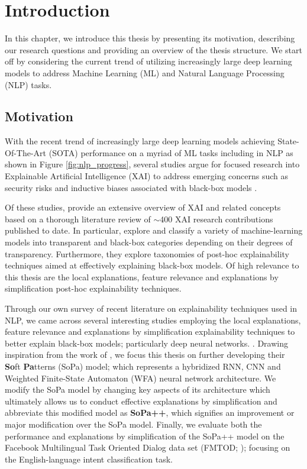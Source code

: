 \chapter{Introduction}

\label{chapter:introduction}

In this chapter, we introduce this thesis by presenting its motivation,
describing our research questions and providing an overview of the thesis
structure. We start off by considering the current trend of utilizing
increasingly large deep learning models to address Machine Learning (ML)
and Natural Language Processing (NLP) tasks.

\section{Motivation}

With the recent trend of increasingly large deep learning models achieving
State-Of-The-Art (SOTA) performance on a myriad of ML tasks
including in NLP as shown in Figure \ref{fig:nlp_progress}, several studies argue for
focused research into Explainable Artificial Intelligence (XAI) to address
emerging concerns such as security risks and inductive biases associated with
black-box models
\citep{doran2017does,townsend2019extracting,danilevsky2020survey,arrieta2020explainable}.

Of these studies, \citet{arrieta2020explainable} provide an extensive overview
of XAI and related concepts based on a thorough literature review of $\sim$400
XAI research contributions published to date. In particular,
\citet{arrieta2020explainable} explore and classify a variety of
machine-learning models into transparent and black-box categories depending on
their degrees of transparency. Furthermore, they explore taxonomies of post-hoc
explainability techniques aimed at effectively explaining black-box models. Of high
relevance to this thesis are the local explanations, feature relevance and
explanations by simplification post-hoc explainability techniques.

Through our own survey of recent literature on explainability techniques used
in NLP, we came across several interesting studies employing the local
explanations, feature relevance and explanations by simplification
explainability techniques to better explain black-box models; particularly
deep neural networks.
\citep{schwartz2018sopa,peng2018rational,suresh-etal-2019-distilling,wang2019state,jiang2020cold}.
Drawing inspiration from the work of \citet{schwartz2018sopa}, we focus this
thesis on further developing their \textbf{So}ft \textbf{Pa}tterns (SoPa) model;
which represents a hybridized RNN, CNN and Weighted Finite-State Automaton (WFA)
neural network architecture. We modify the SoPa model by changing key aspects of
its architecture which ultimately allows us to conduct effective explanations by
simplification and abbreviate this modified model as \textbf{SoPa++}, which
signifies an improvement or major modification over the SoPa model. Finally, we
evaluate both the performance and explanations by simplification of the SoPa++
model on the Facebook Multilingual Task Oriented Dialog data set (FMTOD;
\citealt{schuster-etal-2019-cross-lingual}); focusing on the English-language
intent classification task.

